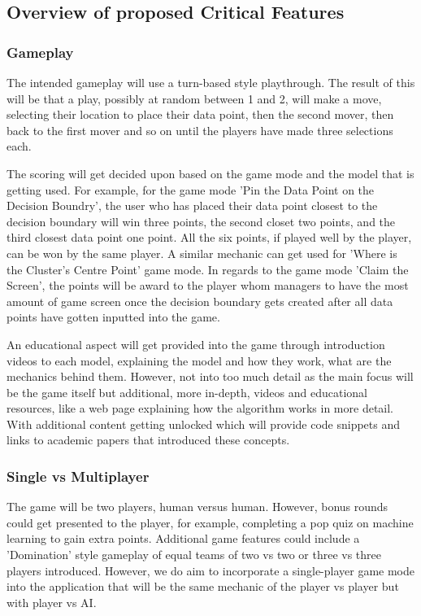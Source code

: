 \documentclass[a4paper,10pt]{article}
\begin{document}
\subsection{Overview of proposed Critical Features}
\subsubsection{Gameplay}
The intended gameplay will use a turn-based style playthrough. The result of this will be that a play, possibly at random between 1 and 2, will make a move, selecting their location to place their data point, then the second mover, then back to the first mover and so on until the players have made three selections each. 

The scoring will get decided upon based on the game mode and the model that is getting used. For example, for the game mode 'Pin the Data Point on the Decision Boundry', the user who has placed their data point closest to the decision boundary will win three points, the second closet two points, and the third closest data point one point. All the six points, if played well by the player, can be won by the same player. A similar mechanic can get used for 'Where is the Cluster's Centre Point' game mode. In regards to the game mode 'Claim the Screen', the points will be award to the player whom managers to have the most amount of game screen once the decision boundary gets created after all data points have gotten inputted into the game.

An educational aspect will get provided into the game through introduction videos to each model, explaining the model and how they work, what are the mechanics behind them. However, not into too much detail as the main focus will be the game itself but additional, more in-depth, videos and educational resources, like a web page explaining how the algorithm works in more detail. With additional content getting unlocked which will provide code snippets and links to academic papers that introduced these concepts.

\subsubsection{Single vs Multiplayer}
The game will be two players, human versus human. However, bonus rounds could get presented to the player, for example, completing a pop quiz on machine learning to gain extra points. Additional game features could include a 'Domination' style gameplay of equal teams of two vs two or three vs three players introduced. However, we do aim to incorporate a single-player game mode into the application that will be the same mechanic of the player vs player but with player vs AI.
\end{document}
